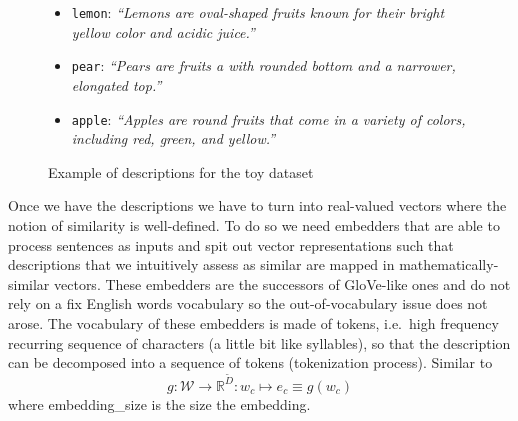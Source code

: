 \begin{figure}[htbp]
  \begin{minipage}{\textwidth}
    \begin{itemize}
      \item \texttt{lemon}: \emph{\small``Lemons are \alert{oval-shaped} fruits
        known for their \alert{bright yellow} color and acidic juice.''}
      \item \texttt{pear}: \emph{\small``Pears are fruits a with \alert{rounded
        bottom} and a narrower, \alert{elongated top}.''}
      \item \texttt{apple}: \emph{\small``Apples are \alert{round} fruits that
        come in a variety of colors, including \alert{red}, \alert{green}, and
        \alert{yellow}.''}
    \end{itemize}
    \caption{Example of descriptions for the toy dataset}
    \label{fig:descriptions}
  \end{minipage}
\end{figure}

Once we have the descriptions we have to turn into real-valued vectors where the
notion of similarity is well-defined. To do so we need embedders that are able
to process sentences as inputs and spit out vector representations such that
descriptions that we intuitively assess as similar are mapped in
mathematically-similar vectors. These embedders are the successors of GloVe-like
ones and do not rely on a fix English words vocabulary so the out-of-vocabulary
issue does not arose. The vocabulary of these embedders is made of tokens, i.e.\
high frequency recurring sequence of characters (a little bit like syllables),
so that the description can be decomposed into a sequence of tokens
(tokenization process). Similar to~\Cref{eq:word-encoding}
\begin{equation}
  g : \mathcal{W} \to \mathbb{R}^{\tilde{D}} :
  w_c \mapsto e_c \equiv g(w_c)
  \label{eq:desc-embedding}
\end{equation}
where \gls{embedding_size} is the size the embedding.\\


